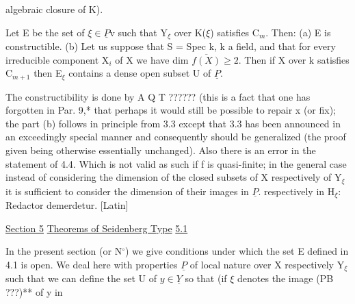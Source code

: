 
algebraic closure of K).

Let E be the set of $\xi \in \underline{P}$v such that Y$_{\xi}$ over K($\xi$) satisfies
C$_{m}$. Then: (a) E is constructible. (b) Let us suppose that S =
Spec k, k a field, and that for every irreducible component X$_{i}$ of X
we have dim $\overline{f(X)} \geq 2$. Then if X over k satisfies C$_{m+1}$ then E$_{\xi}$
contains a dense open subset U of $\underline{P}$.

The constructibility is done by A Q T ?????? (this is a fact
that one has forgotten in Par. 9,* that perhaps it would still be
possible to repair x (or fix); the part (b) follows in principle
from 3.3 except that 3.3 has been announced in an exceedingly
special manner and consequently should be generalized (the proof
given being otherwise essentially unchanged). Also there is an
error in the statement of 4.4. Which is not valid as such if f is
quasi-finite; in the general case instead of considering the
dimension of the closed subsets of X respectively of Y$_{\xi}$ it is
sufficient to consider the dimension of their images in $\underline{P}$.
respectively in H$_{\xi}$:
Redactor demerdetur. [Latin]

\uline{Section 5} \uline{Theorems of Seidenberg Type}
\uline{5.1}

In the present section (or N$^{\circ}$) we give conditions under which
the set E defined in 4.1 is open. We deal here with properties $\underline{P}$
of local nature over X respectively Y$_{\xi}$ such that we can define the
set U of $y \in \underline{Y}$ so that (if $\xi$ denotes the image (PB ???)** of y in

